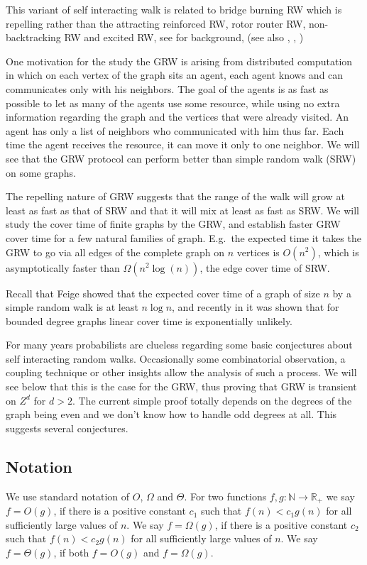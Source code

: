 \documentclass[12pt,a4paper]{article}
\newcommand{\0}{{\bf 0}}
\newcommand{\N}{{\mathbb N}}
\newcommand{\R}{{\mathbb R}}
\begin{document}
This variant of self interacting walk is related to bridge burning RW
which is repelling rather than the attracting reinforced RW, rotor
router RW, non-backtracking RW and excited RW, see \cite{Pem07} for background,
(see also \cite{FrSa10}, \cite{ABLS06}, \cite{BW03})

One motivation for the study the GRW is arising from distributed computation in which on each vertex of the graph sits an agent,
each agent knows and can communicates only with his neighbors.
The goal of the agents is as fast as possible to let as many of the agents use some resource,
while using no extra information regarding the graph and the vertices that were already visited.
An agent has only a list of neighbors who communicated with him thus far.
Each time the agent receives the resource, it can move it only to one neighbor.
We will see that  the GRW protocol can perform better than simple random walk (SRW) on some graphs.

The repelling nature of GRW suggests that the range of the walk will
grow at least as fast as that of SRW and that it will mix at least as fast as SRW.
We will study the cover time of finite graphs by the GRW, and
establish faster GRW cover time for a few natural families of graph.
E.g.\ the expected time it takes the GRW to go via all edges
of the complete graph on $n$ vertices is $O(n^2)$,
which is asymptotically faster than $\Omega (n^2 \log(n))$, the edge cover time of SRW.

Recall that Feige \cite{Feige95lowerbound} showed that the expected cover time of a
graph of size $n$ by a simple random walk is at least $n \log n$,
and recently in \cite{BGM} it was shown that for bounded degree graphs linear cover time is
exponentially unlikely.

For many years probabilists are clueless regarding some
basic conjectures about self interacting random walks. Occasionally
some combinatorial observation, a coupling technique
or other insights allow the analysis of such a process. We will see
below that this is the case for the GRW, thus proving that
GRW is transient on $Z^d$ for $d >2$. The current simple proof totally
depends on the degrees of the graph being even and we don't know
how to handle odd degrees at all. This suggests several conjectures.

\subsection{Notation}\label{sec:notation}
We use standard notation of $O$, $\Omega$ and $\Theta$.
For two functions $f,g : \N \to \R_+$
we say $f = O(g)$, if there is a positive constant $c_1$ such that $f(n) < c_1 g(n)$ for all sufficiently large values of $n$.
We say $f = \Omega(g)$, if there is a positive constant $c_2$ such that $f(n) < c_2 g(n)$ for all sufficiently large values of $n$.
We say $f = \Theta(g)$,  if both $f = O(g)$ and $f = \Omega(g)$.
\end{document}
